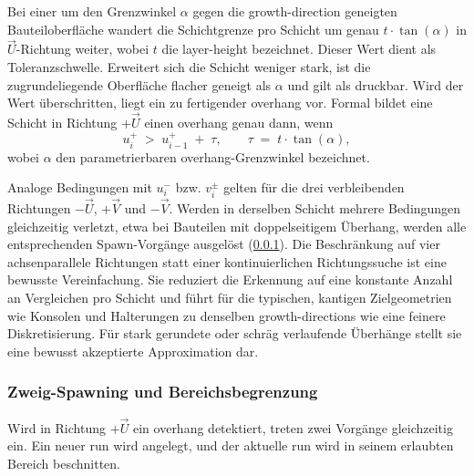                 Bei einer um den Grenzwinkel $\alpha$ gegen die \gls{growth-direction} geneigten Bau\-teil\-ober\-fläche wandert die Schichtgrenze pro Schicht um genau $t \cdot \tan(\alpha)$ in $\vec{U}$-Richtung weiter, wobei $t$ die \gls{layer-height} bezeichnet.
                Dieser Wert dient als Toleranzschwelle.
                Erweitert sich die Schicht weniger stark, ist die zugrundeliegende Oberfläche flacher geneigt als $\alpha$ und gilt als druckbar.
                Wird der Wert überschritten, liegt ein zu fertigender \gls{overhang} vor.
                Formal bildet eine Schicht in Richtung $+\vec{U}$ einen \gls{overhang} genau dann, wenn
                \begin{equation}
                    u^+_i \;>\; u^+_{i-1} \;+\; \tau,\qquad
                    \tau \;=\; t \cdot \tan(\alpha),
                    \label{eq:concept-base-overhang-tolerance}
                \end{equation}
                wobei $\alpha$ den parametrierbaren \gls{overhang}-Grenzwinkel bezeichnet. 

                Analoge Bedingungen mit $u^-_i$ bzw. $v^\pm_i$ gelten für die drei verbleibenden Richtungen $-\vec{U}$, $+\vec{V}$ und $-\vec{V}$.
                Werden in derselben Schicht mehrere Bedingungen gleichzeitig verletzt, etwa bei Bauteilen mit doppelseitigem Überhang, werden alle entsprechenden Spawn-Vorgänge ausgelöst (\cref{subsubsec:concept-base-branch-spawning}).
                Die Beschränkung auf vier achsenparallele Richtungen statt einer kontinuierlichen Richtungssuche ist eine bewusste Vereinfachung.
                Sie reduziert die Erkennung auf eine konstante Anzahl an Vergleichen pro Schicht und führt für die typischen, kantigen Zielgeometrien wie Konsolen und Halterungen zu denselben \glspl{growth-direction} wie eine feinere Diskretisierung.
                Für stark gerundete oder schräg verlaufende Überhänge stellt sie eine bewusst akzeptierte Approximation dar.

            \subsubsection{Zweig-Spawning und Bereichsbegrenzung}\label{subsubsec:concept-base-branch-spawning} 
                Wird in Richtung $+\vec{U}$ ein \gls{overhang} detektiert, treten zwei Vorgänge gleichzeitig ein.
                Ein neuer \gls{run} wird angelegt, und der aktuelle \gls{run} wird in seinem erlaubten Bereich beschnitten.

